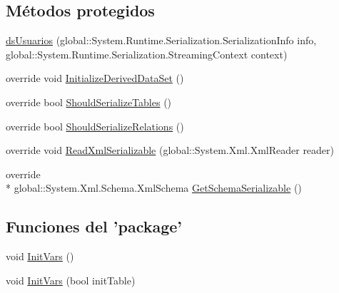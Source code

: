\subsection*{Métodos protegidos}
\begin{DoxyCompactItemize}
\item 
\hyperlink{class_proyecto___integrador__3_1_1ds_usuarios_aa420b8cf327ef197b2777836d2973ac7}{ds\-Usuarios} (global\-::\-System.\-Runtime.\-Serialization.\-Serialization\-Info info, global\-::\-System.\-Runtime.\-Serialization.\-Streaming\-Context context)
\item 
override void \hyperlink{class_proyecto___integrador__3_1_1ds_usuarios_a376fcd38fd48cc992c13823ad66407b5}{Initialize\-Derived\-Data\-Set} ()
\item 
override bool \hyperlink{class_proyecto___integrador__3_1_1ds_usuarios_abfc4f5e8927f3e3a4200e26d42dec316}{Should\-Serialize\-Tables} ()
\item 
override bool \hyperlink{class_proyecto___integrador__3_1_1ds_usuarios_ade2213652e4c181990f6cbaa7ea26010}{Should\-Serialize\-Relations} ()
\item 
override void \hyperlink{class_proyecto___integrador__3_1_1ds_usuarios_a9b6ce8f4cc266f936be2eaa58345a961}{Read\-Xml\-Serializable} (global\-::\-System.\-Xml.\-Xml\-Reader reader)
\item 
override \\*
global\-::\-System.\-Xml.\-Schema.\-Xml\-Schema \hyperlink{class_proyecto___integrador__3_1_1ds_usuarios_ad6fda7e9196e9950572eebfceb728a9e}{Get\-Schema\-Serializable} ()
\end{DoxyCompactItemize}
\subsection*{Funciones del 'package'}
\begin{DoxyCompactItemize}
\item 
void \hyperlink{class_proyecto___integrador__3_1_1ds_usuarios_ab120e453e46f20e82cdb1440541a8bfc}{Init\-Vars} ()
\item 
void \hyperlink{class_proyecto___integrador__3_1_1ds_usuarios_aee9d56106e0fb5888c9fe50cd9ac51b2}{Init\-Vars} (bool init\-Table)
\end{DoxyCompactItemize}
